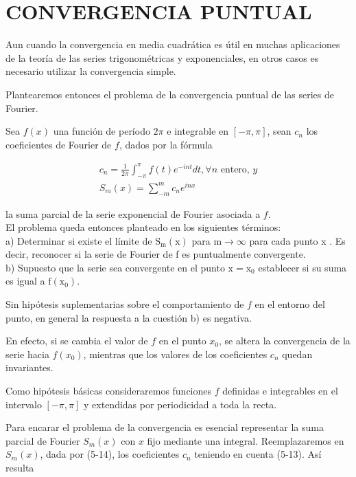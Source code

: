 \documentclass[10pt]{article}
\theoremstyle{plain}
\theoremstyle{definition}
\theoremstyle{remark}
\begin{document}
\section*{CONVERGENCIA PUNTUAL}
Aun cuando la convergencia en media cuadrática es útil en muchas aplicaciones de la teoría de las series trigonométricas y exponenciales, en otros casos es necesario utilizar la convergencia simple.

Plantearemos entonces el problema de la convergencia puntual de las series de Fourier.

Sea $f(x)$ una función de período $2 \pi$ e integrable en $[-\pi, \pi]$, sean $c_{n}$ los coeficientes de Fourier de $f$, dados por la fórmula


\begin{gather*}
c_{n}=\frac{1}{2 \pi} \int_{-\pi}^{\pi} f(t) e^{-i n t} d t, \forall n \text { entero, } y  \tag{5-13}\\
S_{m}(x)=\sum_{-m}^{m} c_{n} e^{i n x} \tag{5-14}
\end{gather*}


la suma parcial de la serie exponencial de Fourier asociada a $f$.\\
El problema queda entonces planteado en los siguientes términos:\\
a) Determinar si existe el límite de $\mathrm{S}_{\mathrm{m}}(\mathrm{x})$ para $\mathrm{m} \rightarrow \infty$ para cada punto x . Es decir, reconocer si la serie de Fourier de f es puntualmente convergente.\\
b) Supuesto que la serie sea convergente en el punto $\mathrm{x}=\mathrm{x}_{0}$ establecer si su suma es igual a $\mathrm{f}\left(\mathrm{x}_0\right)$.

Sin hipótesis suplementarias sobre el comportamiento de $f$ en el entorno del punto, en general la respuesta a la cuestión b) es negativa.

En efecto, si se cambia el valor de $f$ en el punto $x_{0}$, se altera la convergencia de la serie hacia $f\left(x_{0}\right)$, mientras que los valores de los coeficientes $c_{n}$ quedan invariantes.

Como hipótesis básicas consideraremos funciones $f$ definidas e integrables en el intervalo $[-\pi, \pi]$ y extendidas por periodicidad a toda la recta.

Para encarar el problema de la convergencia es esencial representar la suma parcial de Fourier $S_{m}(x)$ con $x$ fijo mediante una integral. Reemplazaremos en $S_{m}(x)$, dada por (5-14), los coeficientes $c_{n}$ teniendo en cuenta (5-13). Así resulta
\end{document}
